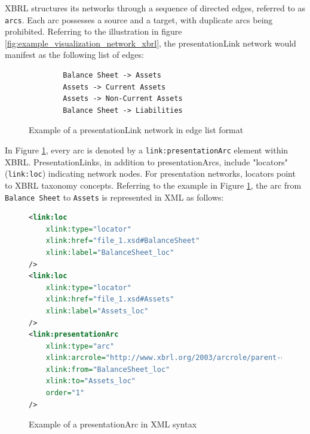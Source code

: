 XBRL structures its networks through a sequence of directed edges, referred to as \texttt{arcs}.
Each arc possesses a source and a target, with duplicate arcs being prohibited.
Referring to the illustration in figure \ref{fig:example_visualization_network_xbrl},
the presentationLink network would manifest as the following list of edges:

\begin{figure}[H]
    \caption{Example of a presentationLink network in edge list format}
    \label{fig:example_visualization_network_xbrl_edge_list}
    \begin{verbatim}
        Balance Sheet -> Assets
        Assets -> Current Assets
        Assets -> Non-Current Assets
        Balance Sheet -> Liabilities
    \end{verbatim}
\end{figure}


In Figure \ref{fig:example_visualization_network_xbrl_edge_list}, every arc is denoted by a \texttt{link:presentationArc} element within XBRL.
PresentationLinks, in addition to presentationArcs, include "locators" (\texttt{link:loc}) indicating network nodes.
For presentation networks, locators point to XBRL taxonomy concepts.
Referring to the example in Figure \ref{fig:example_visualization_network_xbrl_edge_list},
the arc from \texttt{Balance Sheet} to \texttt{Assets} is represented in XML as follows:

\begin{figure}[H]
    \centering
    \begin{lstlisting}[language=XML, basicstyle=\small\ttfamily]
<link:loc 
    xlink:type="locator" 
    xlink:href="file_1.xsd#BalanceSheet"
    xlink:label="BalanceSheet_loc"
/>
<link:loc 
    xlink:type="locator" 
    xlink:href="file_1.xsd#Assets"
    xlink:label="Assets_loc"
/>
<link:presentationArc 
    xlink:type="arc" 
    xlink:arcrole="http://www.xbrl.org/2003/arcrole/parent-child" 
    xlink:from="BalanceSheet_loc" 
    xlink:to="Assets_loc"
    order="1"
/>
\end{lstlisting}
    \caption{Example of a presentationArc in XML syntax}
    \label{fig:example_presentation_arc_xml}
\end{figure}

